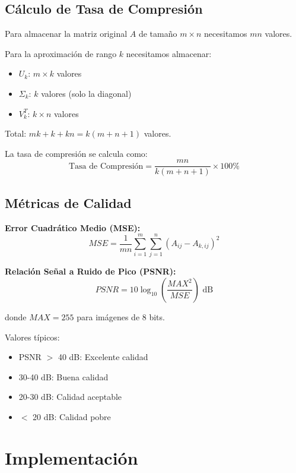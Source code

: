 \documentclass[12pt,a4paper]{article}
\begin{document}
	\subsection{Cálculo de Tasa de Compresión}
	
	Para almacenar la matriz original $A$ de tamaño $m \times n$ necesitamos $mn$ valores.
	
	Para la aproximación de rango $k$ necesitamos almacenar:
	\begin{itemize}
		\item $U_k$: $m \times k$ valores
		\item $\Sigma_k$: $k$ valores (solo la diagonal)
		\item $V_k^T$: $k \times n$ valores
	\end{itemize}
	
	Total: $mk + k + kn = k(m + n + 1)$ valores.
	
	La tasa de compresión se calcula como:
	\begin{equation}
		\text{Tasa de Compresión} = \frac{mn}{k(m + n + 1)} \times 100\%
	\end{equation}
	
	\subsection{Métricas de Calidad}
	
	\textbf{Error Cuadrático Medio (MSE):}
	\begin{equation}
		MSE = \frac{1}{mn} \sum_{i=1}^{m} \sum_{j=1}^{n} (A_{ij} - A_{k,ij})^2
	\end{equation}
	
	\textbf{Relación Señal a Ruido de Pico (PSNR):}
	\begin{equation}
		PSNR = 10 \log_{10} \left( \frac{MAX^2}{MSE} \right) \text{ dB}
	\end{equation}
	
	donde $MAX = 255$ para imágenes de 8 bits.
	
	Valores típicos:
	\begin{itemize}
		\item PSNR $>$ 40 dB: Excelente calidad
		\item 30-40 dB: Buena calidad
		\item 20-30 dB: Calidad aceptable
		\item $<$ 20 dB: Calidad pobre
	\end{itemize}
	
	\section{Implementación}
	
\end{document}
